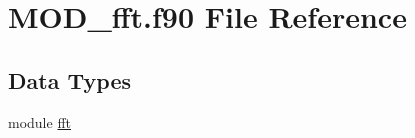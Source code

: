 \hypertarget{MOD__fft_8f90}{\section{M\-O\-D\-\_\-fft.\-f90 File Reference}
\label{MOD__fft_8f90}
}
\subsection*{Data Types}
\begin{DoxyCompactItemize}
\item 
module \hyperlink{classfft}{fft}
\end{DoxyCompactItemize}
